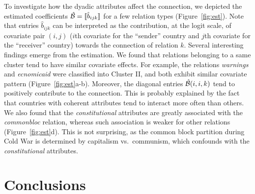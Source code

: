 \documentclass[twoside]{article}
\theoremstyle{plain}
\theoremstyle{definition}
\begin{document}
To investigate how the dyadic attributes affect the connection, we depicted the estimated coefficients $\hat {\mathcal{B}}=\llbracket \hat b_{ijk} \rrbracket$ for a few relation types (Figure~\ref{fig:est}). Note that entries $\hat b_{ijk}$ can be interpreted as the contribution, at the logit scale, of covariate pair $(i,j)$ ($i$th covariate for the ``sender'' country and $j$th covariate for the ``receiver'' country) towards the connection of relation $k$.  Several interesting findings emerge from the estimation. We found that relations belonging to a same cluster tend to have similar covariate effects. For example, the relations \emph{warnings} and \emph{ecnomicaid} were classified into Cluster II, and both exhibit similar covariate pattern (Figure~\ref{fig:est}a-b). Moreover, the diagonal entries $\hat {\mathcal{B}}(i,i,k)$ tend to positively contribute to the connection. This is probably explained by the fact that countries with coherent attributes tend to interact more often than others. We also found that the \emph{constitutional} attributes are greatly associated with the \emph{commonbloc} relation, whereas such association is weaker for other relations (Figure~\ref{fig:est}d). This is not surprising, as the common block partition during Cold War is determined by capitalism vs.\ communism, which confounds with the \emph{constitutional} attributes. 

\section{Conclusions}


\end{document}
